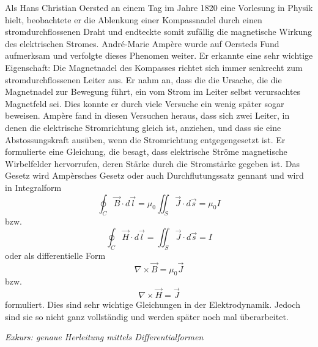 Als Hans Christian Oersted an einem Tag im Jahre 1820 eine Vorlesung in Physik hielt, beobachtete er die Ablenkung einer Kompassnadel durch einen stromdurchflossenen Draht und endteckte somit zufällig die magnetische Wirkung des elektrischen Stromes.
André-Marie Ampère wurde auf Oersteds Fund aufmerksam und verfolgte dieses Phenomen weiter.
Er erkannte eine sehr wichtige Eigenschaft: Die Magnetnadel des Kompasses richtet sich immer senkrecht zum stromdurchflossenen Leiter aus.
Er nahm an, dass die die Ursache, die die Magnetnadel zur Bewegung führt, ein vom Strom im Leiter selbst verursachtes Magnetfeld sei.
Dies konnte er durch viele Versuche ein wenig später sogar beweisen.
Ampère fand in diesen Versuchen heraus, dass sich zwei Leiter, in denen die elektrische Stromrichtung gleich ist, anziehen, und dass sie eine Abstossungskraft ausüben, wenn die Stromrichtung entgegengesetzt ist.
Er formulierte eine Gleichung, die besagt, dass elektrische Ströme magnetische Wirbelfelder hervorrufen, deren Stärke durch die Stromstärke gegeben ist.
Das Gesetz wird Ampèrsches Gesetz oder auch Durchflutungssatz gennant und wird in Integralform
$$
\oint_{C}
\vec{B}
\cdot
d \vec{l}
=
\mu_0
\iint_{S}
\vec{J}
\cdot
d\vec{s}
=
\mu_0
I
$$
bzw.
$$
\oint_{C}
\vec{H}
\cdot
d\vec{l}
=
\iint_{S}
\vec{J}
\cdot
d\vec{s}
=
I
$$
oder als differentielle Form
$$
\nabla
\times
\vec{B}
=
\mu_0 \vec{J}
$$
bzw.
$$
\nabla
\times
\vec{H}
=
\vec{J}
$$
formuliert.
Dies sind sehr wichtige Gleichungen in der Elektrodynamik.
Jedoch sind sie so nicht ganz vollständig und werden später noch mal überarbeitet.


\textit{Exkurs: genaue Herleitung mittels Differentialformen}

